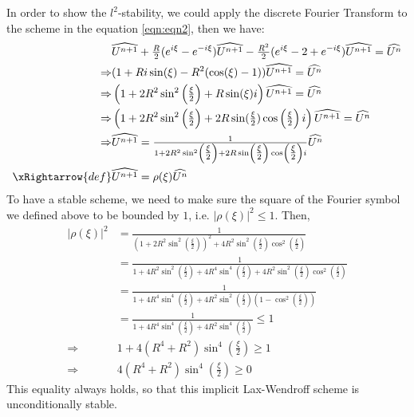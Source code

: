 \begin{answer}
    In order to show the $l^{2}$-stability, we could apply the discrete Fourier Transform to the scheme in the equation \ref{eqn:eqn2}, then we have:
    \begin{equation}
        \begin{aligned}
            &\widehat{U^{n+1}}+\tfrac{R}{2}(e^{i\xi} - e^{-i\xi})\widehat{U^{n+1}} - \tfrac{R^2}{2}(e^{i\xi} - 2 + e^{-i\xi})\widehat{U^{n+1}} = \widehat{U^{n}}\\
            \Rightarrow &(1 + Ri\sin(\xi) - R^2(\cos(\xi) - 1))\widehat{U^{n+1}} = \widehat{U^{n}}\\
            \Rightarrow &\left(1 + 2R^2\sin^2\left(\tfrac{\xi}{2}\right) + R\sin(\xi)i\right) \widehat{U^{n+1}} = \widehat{U^n}\\
            \Rightarrow &\left(1 + 2R^2\sin^{2}\left(\tfrac{\xi}{2}\right) + 2R\sin(\tfrac{\xi}{2})\cos\left(\tfrac{\xi}{2}\right)i\right)\widehat{U^{n+1}} = \widehat{U^n}\\
            \Rightarrow &\widehat{U^{n+1}} = \tfrac{1}{1 + 2R^2\sin^{2}\left(\tfrac{\xi}{2}\right) + 2R\sin\left(\tfrac{\xi}{2}\right)\cos\left(\tfrac{\xi}{2}\right)i}\widehat{U^n}\\
            \xRightarrow{def} &\widehat{U^{n+1}} = \rho(\xi)\widehat{U^n}
        \end{aligned}
    \end{equation}
    To have a stable scheme, we need to make sure the square of the Fourier symbol we defined above to be bounded by $1$, i.e. $\lvert \rho(\xi) \rvert^2 \leq 1$. Then,
    \begin{equation}
        \begin{aligned}
            \lvert \rho(\xi) \rvert^2 &= \tfrac{1}{\left(1+2R^2\sin^2\left(\tfrac{\xi}{2}\right)\right)^2 + 4R^2\sin^2\left(\tfrac{\xi}{2}\right)\cos^2\left(\tfrac{\xi}{2}\right)}\\
            &= \tfrac{1}{1+4R^2\sin^2\left(\tfrac{\xi}{2}\right) + 4R^4\sin^4(\tfrac{\xi}{2}) + 4R^2\sin^2\left(\tfrac{\xi}{2}\right)\cos^2\left(\tfrac{\xi}{2}\right)}\\
            &= \tfrac{1}{1 + 4R^4\sin^4(\tfrac{\xi}{2}) + 4R^2\sin^2\left(\tfrac{\xi}{2}\right) \left(1 - \cos^2\left(\tfrac{\xi}{2}\right) \right)}\\
            &= \tfrac{1}{1 + 4R^4\sin^4(\tfrac{\xi}{2}) + 4R^2\sin^4\left(\tfrac{\xi}{2}\right)} \leq 1\\
            \Rightarrow &1 + 4(R^4+R^2)\sin^4(\tfrac{\xi}{2}) \geq 1\\
            \Rightarrow &4(R^4+R^2)\sin^4(\tfrac{\xi}{2}) \geq 0
        \end{aligned}
    \end{equation}
    This equality always holds, so that this implicit Lax-Wendroff scheme is unconditionally stable.
\end{answer}
